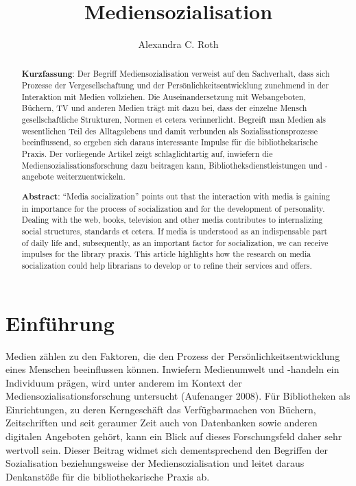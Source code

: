\documentclass[a4paper,
fontsize=11pt,
oneside,
numbers=noperiodatend,
parskip=half-,
bibliography=totoc,
final
]{scrartcl}
\title{\LARGE{Mediensozialisation}}%
\author{Alexandra C. Roth} %
\date{}
\begin{document}
\maketitle
\thispagestyle{fancyplain} 

\begin{abstract}
\noindent
\textbf{Kurzfassung}: Der Begriff Mediensozialisation verweist auf den
Sachverhalt, dass sich Prozesse der Vergesellschaftung und der
Persönlichkeitsentwicklung zunehmend in der Interaktion mit Medien
vollziehen. Die Auseinandersetzung mit Webangeboten, Büchern, TV und
anderen Medien trägt mit dazu bei, dass der einzelne Mensch
gesellschaftliche Strukturen, Normen et cetera verinnerlicht. Begreift
man Medien als wesentlichen Teil des Alltagslebens und damit verbunden
als Sozialisationsprozesse beeinflussend, so ergeben sich daraus
interessante Impulse für die bibliothekarische Praxis. Der vorliegende
Artikel zeigt schlaglichtartig auf, inwiefern die
Mediensozialisationsforschung dazu beitragen kann,
Bibliotheksdienstleistungen und -angebote weiterzuentwickeln.

\noindent \textbf{Abstract}: \enquote{Media socialization} points out that the
interaction with media is gaining in importance for the process of
socialization and for the development of personality. Dealing with the
web, books, television and other media contributes to internalizing
social structures, standards et cetera. If media is understood as an
indispensable part of daily life and, subsequently, as an important
factor for socialization, we can receive impulses for the library
praxis. This article highlights how the research on media socialization
could help librarians to develop or to refine their services and offers.
\end{abstract}

\hypertarget{einfuxfchrung}{%
\section{Einführung}\label{einfuxfchrung}}

Medien zählen zu den Faktoren, die den Prozess der
Persönlichkeitsentwicklung eines Menschen beeinflussen können. Inwiefern
Medienumwelt und -handeln ein Individuum prägen, wird unter anderem im
Kontext der Mediensozialisationsforschung untersucht (Aufenanger 2008).
Für Bibliotheken als Einrichtungen, zu deren Kerngeschäft das
Verfügbarmachen von Büchern, Zeitschriften und seit geraumer Zeit auch
von Datenbanken sowie anderen digitalen Angeboten gehört, kann ein Blick
auf dieses Forschungsfeld daher sehr wertvoll sein. Dieser Beitrag
widmet sich dementsprechend den Begriffen der Sozialisation
beziehungsweise der Mediensozialisation und leitet daraus Denkanstöße
für die bibliothekarische Praxis ab.
\end{document}
